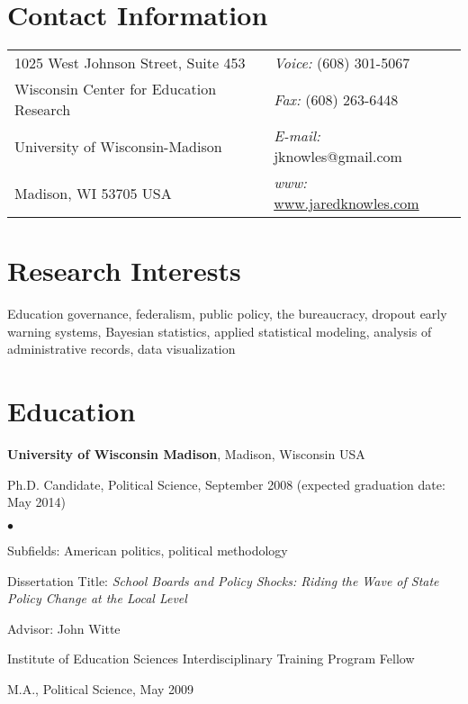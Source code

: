 \documentclass[margin,line]{res}
\newenvironment{list1}{
  \begin{list}{\ding{113}}{%
      \setlength{\itemsep}{0in}
      \setlength{\parsep}{0in} \setlength{\parskip}{0in}
      \setlength{\topsep}{0in} \setlength{\partopsep}{0in} 
      \setlength{\leftmargin}{0.17in}}}{\end{list}}
\newenvironment{list2}{
  \begin{list}{$\bullet$}{%
      \setlength{\itemsep}{0in}
      \setlength{\parsep}{0in} \setlength{\parskip}{0in}
      \setlength{\topsep}{0in} \setlength{\partopsep}{0in} 
      \setlength{\leftmargin}{0.2in}}}{\end{list}}
\begin{document}

\begin{resume}
\section{\sc Contact Information}
\vspace{.05in}
\begin{tabular}{@{}p{2.75in}p{2.75in}}
1025 West Johnson Street, Suite 453             & {\it Voice:}  (608) 301-5067 \\            
Wisconsin Center for Education Research   & {\it Fax:}    (608) 263-6448  \\         
University of Wisconsin-Madison & {\it E-mail:}  jknowles@gmail.com\\       
Madison, WI  53705 USA  & {\it www:} \url{www.jaredknowles.com} \\     
\end{tabular}


\section{\sc Research Interests}
Education governance, federalism, public policy, the bureaucracy, dropout early warning systems, Bayesian statistics, applied statistical modeling, analysis of administrative records, data visualization

\section{\sc Education}
{\bf University of Wisconsin Madison}, Madison, Wisconsin USA\\
\vspace*{-.1in}
\begin{list1}
\item[] Ph.D. Candidate, Political Science, September 2008 (expected
  graduation date: May 2014)
\begin{list2}
\vspace*{.05in}
\item Subfields: American politics, political methodology
\item Dissertation Title: \emph {School Boards and Policy Shocks: Riding the Wave of State Policy Change at the Local Level} 
\item Advisor:  John Witte
\item Institute of Education Sciences Interdisciplinary Training Program Fellow
\end{list2}
\vspace*{.05in}
\item[] M.A., Political Science,  May 2009
\end{list1}


\end{resume}
\end{document}
